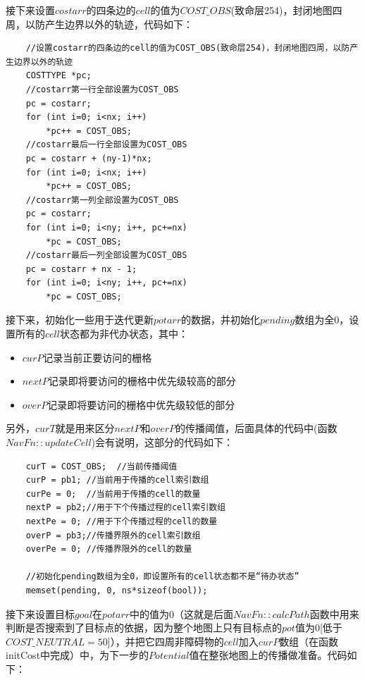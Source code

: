 \documentclass[9pt, oneside]{book}
\begin{document}
接下来设置$costarr$的四条边的$cell$的值为$COST\_OBS$(致命层254)，封闭地图四周，以防产生边界以外的轨迹，代码如下：

\small
\begin{verbatim}
    //设置costarr的四条边的cell的值为COST_OBS(致命层254)，封闭地图四周，以防产生边界以外的轨迹
    COSTTYPE *pc;
    //costarr第一行全部设置为COST_OBS
    pc = costarr;
    for (int i=0; i<nx; i++)
        *pc++ = COST_OBS;
    //costarr最后一行全部设置为COST_OBS
    pc = costarr + (ny-1)*nx;
    for (int i=0; i<nx; i++)
        *pc++ = COST_OBS;
    //costarr第一列全部设置为COST_OBS
    pc = costarr;
    for (int i=0; i<ny; i++, pc+=nx)
        *pc = COST_OBS;
    //costarr最后一列全部设置为COST_OBS
    pc = costarr + nx - 1;
    for (int i=0; i<ny; i++, pc+=nx)
        *pc = COST_OBS;
\end{verbatim}
\normalsize

接下来，初始化一些用于迭代更新$potarr$的数据，并初始化$pending$数组为全0，设置所有的$cell$状态都为非代办状态，其中：

\begin{itemize}
    \item $curP$记录当前正要访问的栅格
    \item $nextP$记录即将要访问的栅格中优先级较高的部分
    \item $overP$记录即将要访问的栅格中优先级较低的部分
\end{itemize}

另外，$curT$就是用来区分$nextP$和$overP$的传播阈值，后面具体的代码中(函数$NavFn::updateCell$)会有说明，这部分的代码如下：

\begin{verbatim}
    curT = COST_OBS;  //当前传播阈值
    curP = pb1; //当前用于传播的cell索引数组
    curPe = 0;  //当前用于传播的cell的数量
    nextP = pb2;//用于下个传播过程的cell索引数组
    nextPe = 0; //用于下个传播过程的cell的数量
    overP = pb3;//传播界限外的cell索引数组
    overPe = 0; //传播界限外的cell的数量

    //初始化pending数组为全0，即设置所有的cell状态都不是“待办状态”
    memset(pending, 0, ns*sizeof(bool));   
\end{verbatim}

接下来设置目标$goal$在$potarr$中的值为0（这就是后面$NavFn::calcPath$函数中用来判断是否搜索到了目标点的依据，因为整个地图上只有目标点的$pot$值为0[低于$COST\_NEUTRAL=50$]），并把它四周非障碍物的$cell$加入$curP$数组（在函数initCost中完成）中，为下一步的$Potential$值在整张地图上的传播做准备。代码如下：
\end{document}
